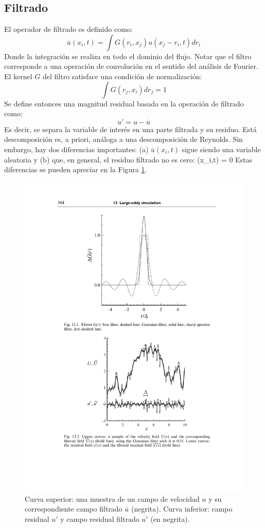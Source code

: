 \subsection{Filtrado}
El operador de filtrado es definido como:
\begin{equation}
\overline{u}(x_i,t) = \int G(r_i,x_j) u(x_j-r_i,t)dr_i
\end{equation}
Donde la integración se realiza en todo el dominio del flujo. Notar que el filtro corresponde a una operación de convolución en el sentido del análisis de Fourier. El kernel $G$ del filtro satisface una condición de normalización:
\begin{equation}
\int G(r_j,x_i)dr_j = 1
\end{equation}
Se define entonces una magnitud residual basada en la operación de filtrado como:
\begin{equation}
u' = u - \overline{u}
\end{equation}
Es decir, se separa la variable de interés en una parte filtrada y su residuo. Está descomposición es, a priori, análoga a una descomposición de Reynolds. Sin embargo, hay dos diferencias importantes: (a) $\overline{u}(x_i,t)$ sigue siendo una variable aleatoria y (b) que, en general, el residuo filtrado no es cero:
\be {}(x_i,t) \not= 0 \ee
Estas diferencias se pueden apreciar en la Figura \ref{fig:03_les}.
\begin{figure}[h!]
	\centering
	\includegraphics[width=0.6\linewidth,trim={4.8cm 4.8cm 2.8cm 12.1cm},clip]{Imagenes/03/les}
	\caption{Curva superior: una muestra de un campo de velocidad $u$ y su correspondiente campo filtrado $\overline{u}$ (negrita). Curva inferior: campo residual $u'$ y campo residual filtrado $\overline{u'}$ (en negrita).}
	\label{fig:03_les}
\end{figure}

